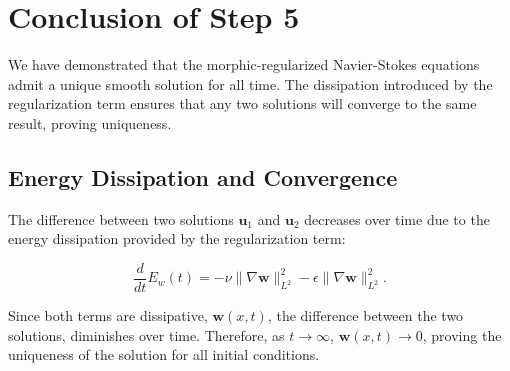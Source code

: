 \documentclass{article}
\begin{document}
\section*{Conclusion of Step 5}

We have demonstrated that the morphic-regularized Navier-Stokes equations admit a unique smooth solution for all time. The dissipation introduced by the regularization term ensures that any two solutions will converge to the same result, proving uniqueness.

\subsection*{Energy Dissipation and Convergence}

The difference between two solutions \( \mathbf{u}_1 \) and \( \mathbf{u}_2 \) decreases over time due to the energy dissipation provided by the regularization term:

\[
\frac{d}{dt} E_w(t) = - \nu \|\nabla \mathbf{w}\|_{L^2}^2 - \epsilon \|\nabla \mathbf{w}\|_{L^2}^2.
\]

Since both terms are dissipative, \( \mathbf{w}(x,t) \), the difference between the two solutions, diminishes over time. Therefore, as \( t \to \infty \), \( \mathbf{w}(x,t) \to 0 \), proving the uniqueness of the solution for all initial conditions.
\end{document}
